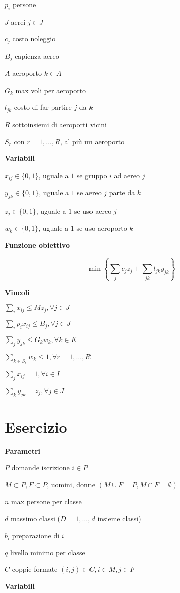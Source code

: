 \documentclass[10pt,a4paper,twoside,openright]{book}
\newcounter{es}
\newcommand{\Es}{
	\stepcounter{es}
	\section{Esercizio \arabic{es}}
	}
\newcommand{\Par}{\textbf{Parametri}}
\newcommand{\Var}{\textbf{Variabili}}
\newcommand{\Fob}{\textbf{Funzione obiettivo}}
\newcommand{\Vin}{\textbf{Vincoli}}
\begin{document}
$p_{i}$ persone

$J$ aerei $j\in J$

$c_{j}$ costo noleggio

$B_{j}$ capienza aereo

$A$ aeroporto $k\in A$

$G_{k}$ max voli per aeroporto

$l_{jk}$ costo di far partire $j$ da $k$

$R$ sottoinsiemi di aeroporti vicini

$S_{r}$ con $r=1,\dotsc ,R$, al più un aeroporto

\Var

$x_{ij} \in \{0,1\}$, uguale a $1$ se gruppo $i$ ad aereo $j$

$y_{jk} \in \{0,1\}$, uguale a $1$ se aereo $j$ parte da $k$

$z_{j} \in \{0,1\}$, uguale a $1$ se uso aereo $j$

$w_{k} \in \{0,1\}$, uguale a $1$ se uso aeroporto $k$

\Fob

\begin{equation*}
	\min\left\{\sum _{j} c_{j} z_{j} +\sum _{jk} l_{jk} y_{jk}\right\}
\end{equation*}

\Vin

$\sum _{i} x_{ij} \leq Mz_{j} ,\forall j\in J$

$\sum _{i} p_{i} x_{ij} \leq B_{j} ,\forall j\in J$

$\sum _{j} y_{jk} \leq G_{k} w_{k} ,\forall k\in K$

$\sum _{k\in S_{r}} w_{k} \leq 1,\forall r=1,\dotsc ,R$

$\sum _{j} x_{ij} =1,\forall i\in I$

$\sum _{k} y_{jk} =z_{j} ,\forall j\in J$

\Es

\Par

$P$ domande iscrizione $i\in P$

$M\subset P,F\subset P$, uomini, donne $( M\cup F=P,M\cap F=\emptyset )$

$n$ max persone per classe

$d$ massimo classi ($D=1,\dotsc ,d$ insieme classi)

$b_{i}$ preparazione di $i$

$q$ livello minimo per classe

$C$ coppie formate $( i,j) \in C,i\in M,j\in F$

\Var
\end{document}
